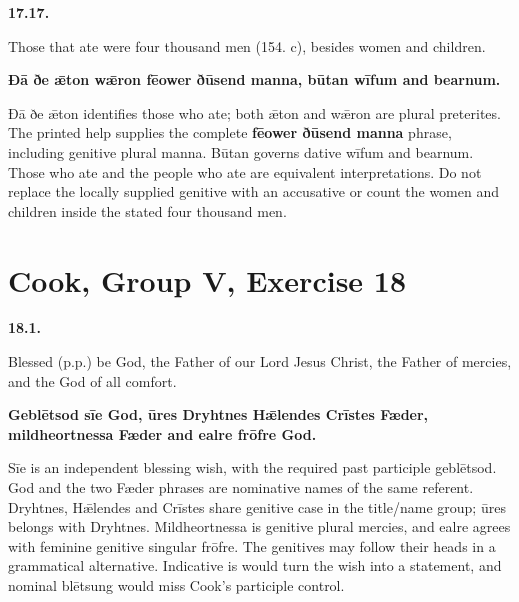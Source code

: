 \par\begin{minipage}{\linewidth}\raggedright
\textbf{17.17.}

Those that ate were four thousand men (154. c), besides women and children.

\textbf{Ðā ðe ǣton wǣron fēower ðūsend manna, būtan wīfum and bearnum.}

Ðā ðe ǣton identifies those who ate; both ǣton and wǣron are plural preterites. The printed help supplies the complete \textbf{fēower ðūsend manna} phrase, including genitive plural manna. Būtan governs dative wīfum and bearnum. Those who ate and the people who ate are equivalent interpretations. Do not replace the locally supplied genitive with an accusative or count the women and children inside the stated four thousand men.

\end{minipage}\par\addvspace{4pt}

\section*{Cook, Group V, Exercise 18}

\par\begin{minipage}{\linewidth}\raggedright
\textbf{18.1.}

Blessed (p.p.) be God, the Father of our Lord Jesus Christ, the Father of mercies, and the God of all comfort.

\textbf{Geblētsod sīe God, ūres Dryhtnes Hǣlendes Crīstes Fæder, mildheortnessa Fæder and ealre frōfre God.}

Sīe is an independent blessing wish, with the required past participle geblētsod. God and the two Fæder phrases are nominative names of the same referent. Dryhtnes, Hǣlendes and Crīstes share genitive case in the title/\allowbreak{}name group; ūres belongs with Dryhtnes. Mildheortnessa is genitive plural mercies, and ealre agrees with feminine genitive singular frōfre. The genitives may follow their heads in a grammatical alternative. Indicative is would turn the wish into a statement, and nominal blētsung would miss Cook's participle control.

\end{minipage}\par\addvspace{4pt}


